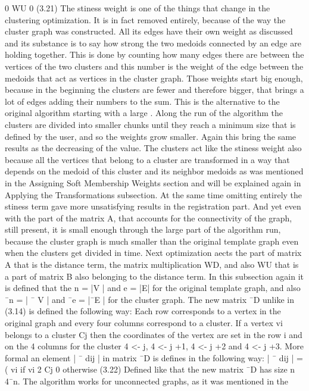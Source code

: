 \documentclass[../structure.tex]{subfiles}
\begin{document}
0
WU
0
(3.21)
The stiness weight  is one of the things that change in the clustering
optimization. It is in fact removed entirely, because of the way the cluster
graph was constructed. All its edges have their own weight as discussed and
its substance is to say how strong the two medoids connected by an edge
are holding together. This is done by counting how many edges there are
between the vertices of the two clusters and this number is the weight of the
edge between the medoids that act as vertices in the cluster graph. Those
weights start big enough, because in the beginning the clusters are fewer and
therefore bigger, that brings a lot of edges adding their numbers to the sum.
This is the alternative to the original algorithm starting with a large . Along
the run of the algorithm the clusters are divided into smaller chunks until
they reach a minimum size that is defined by the user, and so the weights
grow smaller. Again this bring the same results as the decreasing of the 
value.
The clusters act like the stiness weight also because all the vertices that
belong to a cluster are transformed in a way that depends on the medoid
of this cluster and its neighbor medoids as was mentioned in the Assigning
Soft Membership Weights section and will be explained again in Applying the
Transformations subsection. At the same time omitting entirely the stiness
term gave more unsatisfying results in the registration part. And yet even
with the part of the matrix A, that accounts for the connectivity of the graph,
still present, it is small enough through the large part of the algorithm run,
because the cluster graph is much smaller than the original template graph
even when the clusters get divided in time.
Next optimization aects the part of matrix A that is the distance term,
the matrix multiplication WD, and also WU that is a part of matrix B also
belonging to the distance term. In this subsection again it is defined that the
n = |V | and e = |E| for the original template graph, and also ¯n = | ¯ V | and
¯e = |¯E | for the cluster graph. The new matrix ¯D unlike in (3.14) is defined
the following way: Each row corresponds to a vertex in the original graph
and every four columns correspond to a cluster. If a vertex vi belongs to a
cluster Cj then the coordinates of the vertex are set in the row i and on the
4 columns for the cluster 4 <- j, 4 <- j +1, 4 <- j +2 and 4 <- j +3. More formal
an element | ¯ dij | in matrix ¯D is defines in the following way:
| ¯ dij | =
(
vi if vi 2 Cj
0 otherwise
(3.22)
Defined like that the new matrix ¯D has size n  4¯n.
The algorithm works for unconnected graphs, as it was mentioned in the
\end{document}
